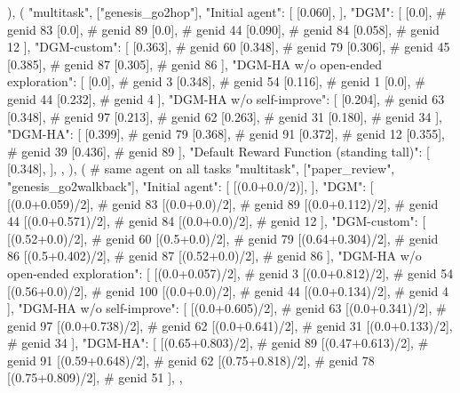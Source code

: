         ),
        (
            "multitask",
            ["genesis_go2hop"],
            {
                "Initial agent": [
                    [0.060],
                ],
                "DGM": [
                    [0.0],  # genid 83
                    [0.0],  # genid 89
                    [0.0],  # genid 44
                    [0.090],  # genid 84
                    [0.058],  # genid 12
                ],
                "DGM-custom": [
                    [0.363],  # genid 60
                    [0.348],  # genid 79
                    [0.306],  # genid 45
                    [0.385],  # genid 87
                    [0.305],  # genid 86
                ],
                "DGM-HA w/o open-ended exploration": [
                    [0.0],  # genid 3
                    [0.348],  # genid 54
                    [0.116],  # genid 1
                    [0.0],  # genid 44
                    [0.232],  # genid 4
                ],
                "DGM-HA w/o self-improve": [
                    [0.204],  # genid 63
                    [0.348],  # genid 97
                    [0.213],  # genid 62
                    [0.263],  # genid 31
                    [0.180],  # genid 34
                ],
                "DGM-HA": [
                    [0.399],  # genid 79
                    [0.368],  # genid 91
                    [0.372],  # genid 12
                    [0.355],  # genid 39
                    [0.436],  # genid 89
                ],
                "Default Reward Function (standing tall)": [
                    [0.348],
                ],
            },
        ),
        (
            # same agent on all tasks
            "multitask",
            ["paper_review", "genesis_go2walkback"],
            {
                "Initial agent": [
                    [(0.0+0.0/2)],
                ],
                "DGM": [
                    [(0.0+0.059)/2],  # genid 83
                    [(0.0+0.0)/2],  # genid 89
                    [(0.0+0.112)/2],  # genid 44
                    [(0.0+0.571)/2],  # genid 84
                    [(0.0+0.0)/2],  # genid 12
                ],
                "DGM-custom": [
                    [(0.52+0.0)/2],  # genid 60
                    [(0.5+0.0)/2],  # genid 79
                    [(0.64+0.304)/2],  # genid 86
                    [(0.5+0.402)/2],  # genid 87
                    [(0.52+0.0)/2],  # genid 86
                ],
                "DGM-HA w/o open-ended exploration": [
                    [(0.0+0.057)/2],  # genid 3
                    [(0.0+0.812)/2],  # genid 54
                    [(0.56+0.0)/2],  # genid 100
                    [(0.0+0.0)/2],  # genid 44
                    [(0.0+0.134)/2],  # genid 4
                ],
                "DGM-HA w/o self-improve": [
                    [(0.0+0.605)/2],  # genid 63
                    [(0.0+0.341)/2],  # genid 97
                    [(0.0+0.738)/2],  # genid 62
                    [(0.0+0.641)/2],  # genid 31
                    [(0.0+0.133)/2],  # genid 34
                ],
                "DGM-HA": [
                    [(0.65+0.803)/2],  # genid 89
                    [(0.47+0.613)/2],  # genid 91
                    [(0.59+0.648)/2],  # genid 62
                    [(0.75+0.818)/2],  # genid 78
                    [(0.75+0.809)/2],  # genid 51
                ],
            },
